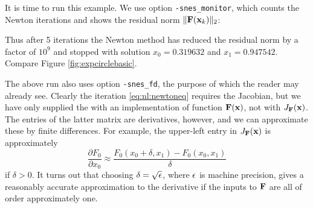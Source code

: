 It is time to run this example.  We use option \texttt{-snes\_monitor}, which counts the Newton iterations and shows the residual norm $\|\mathbf{F}(\mathbf{x}_k)\|_2$:
Thus after 5 iterations the Newton method has reduced the residual norm by a factor of $10^9$ and stopped with solution $x_0=0.319632$ and $x_1=0.947542$.  Compare Figure \ref{fig:expcirclebasic}.

The above run also uses option \texttt{-snes\_fd}, the purpose of which the reader may already see.  Clearly the iteration \eqref{eq:nl:newtoneq} requires the Jacobian, but we have only supplied the \pSNES with an implementation of function $\mathbf{F}(\mathbf{x})$, not with $J_{\mathbf{F}}(\mathbf{x})$.  The entries of the latter matrix are derivatives, however, and we can approximate these by finite differences.  For example, the upper-left entry in $J_{\mathbf{F}}(\mathbf{x})$ is approximately
\begin{equation}
\frac{\partial F_0}{\partial x_0} \approx \frac{F_0(x_0+\delta,x_1) - F_0(x_0,x_1)}{\delta}  \label{eq:nl:examplefdjac}
\end{equation}
if $\delta>0$.  It turns out that choosing $\delta = \sqrt{\epsilon}$, where $\epsilon$ is machine precision, gives a reasonably accurate approximation to the derivative if the inputs to $\mathbf{F}$ are all of order approximately one.\cite{Kelley2003}

